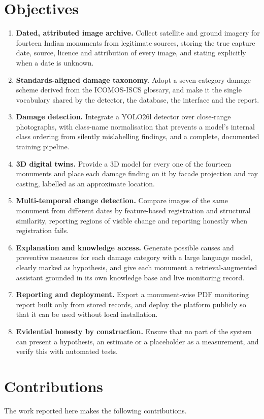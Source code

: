 \documentclass[a4paper,12pt,oneside]{book}
\begin{document}
\section{Objectives}
\begin{enumerate}
    \item \textbf{Dated, attributed image archive.} Collect satellite and ground imagery for fourteen Indian monuments from legitimate sources, storing the true capture date, source, licence and attribution of every image, and stating explicitly when a date is unknown.
    \item \textbf{Standards-aligned damage taxonomy.} Adopt a seven-category damage scheme derived from the ICOMOS-ISCS glossary, and make it the single vocabulary shared by the detector, the database, the interface and the report.
    \item \textbf{Damage detection.} Integrate a YOLO26l detector over close-range photographs, with class-name normalisation that prevents a model's internal class ordering from silently mislabelling findings, and a complete, documented training pipeline.
    \item \textbf{3D digital twins.} Provide a 3D model for every one of the fourteen monuments and place each damage finding on it by facade projection and ray casting, labelled as an approximate location.
    \item \textbf{Multi-temporal change detection.} Compare images of the same monument from different dates by feature-based registration and structural similarity, reporting regions of visible change and reporting honestly when registration fails.
    \item \textbf{Explanation and knowledge access.} Generate possible causes and preventive measures for each damage category with a large language model, clearly marked as hypothesis, and give each monument a retrieval-augmented assistant grounded in its own knowledge base and live monitoring record.
    \item \textbf{Reporting and deployment.} Export a monument-wise PDF monitoring report built only from stored records, and deploy the platform publicly so that it can be used without local installation.
    \item \textbf{Evidential honesty by construction.} Ensure that no part of the system can present a hypothesis, an estimate or a placeholder as a measurement, and verify this with automated tests.
\end{enumerate}

\section{Contributions}
The work reported here makes the following contributions.
\end{document}
